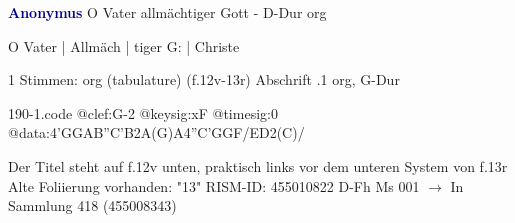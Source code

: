 \documentclass[twocolumn]{book}
\begin{document}
\newline \par \vspace{7pt} \textcolor{darkblue}{\textbf{Anonymus  }}
\newline O Vater allmächtiger Gott - D-Dur
\newline org
\newline \begin{itshape} O Vater | Allmäch | tiger G: | Christe\end{itshape} 
\newline \textcolor{darkblue}{}  1 Stimmen: org (tabulature)  (f.12v-13r)
\newline Abschrift
.1  org, G-Dur  
\begin{filecontents*}{190-1.code}
@clef:G-2
@keysig:xF
@timesig:0
@data:4'GGAB''C'B2A(G)A4''C'GGF/ED2(C)/
\end{filecontents*}
\newline
%
\newline Der Titel steht auf f.12v unten, praktisch links vor dem unteren System von f.13r
\newline Alte Foliierung vorhanden: "13"
\newline RISM-ID: 455010822
\newline D-Fh  Ms 001
\newline $\rightarrow$ In Sammlung 418 (455008343)
      
\end{document}
